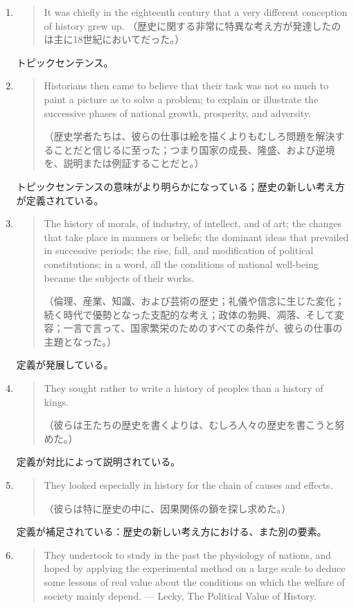 \begin{enumerate}
    \item \begin{quote}
        It was chiefly in the eighteenth century that a very different
conception of history grew up.
（歴史に関する非常に特異な考え方が発達したのは主に18世紀においてだった。）
    \end{quote}
    トピックセンテンス。
    \item 
    \begin{quote}
        Historians then came to believe that their task was not so much
to paint a picture as to solve a problem; to explain or illustrate the
successive phases of national growth, prosperity, and adversity.

（歴史学者たちは、彼らの仕事は絵を描くよりもむしろ問題を解決することだと信じるに至った；つまり国家の成長、隆盛、および逆境を、説明または例証することだと。）
    \end{quote}
    トピックセンテンスの意味がより明らかになっている；歴史の新しい考え方が定義されている。
    \item 
    \begin{quote}
        The history of morals, of industry, of intellect, and of art;
the changes that take place in manners or beliefs; the dominant ideas
that prevailed in successive periods; the rise, fall, and modification
of political constitutions; in a word, all the conditions of national
well-being became the subjects of their works.

（倫理、産業、知識、および芸術の歴史；礼儀や信念に生じた変化；続く時代で優勢となった支配的な考え；政体の勃興、凋落、そして変容；一言で言って、国家繁栄のためのすべての条件が、彼らの仕事の主題となった。）
    \end{quote}
    定義が発展している。
    \item 
    \begin{quote}
        They sought rather to write a history of peoples than a history
of kings.

（彼らは王たちの歴史を書くよりは、むしろ人々の歴史を書こうと努めた。）
    \end{quote}
    定義が対比によって説明されている。
    \item 
    \begin{quote}
        They looked especially in history for the chain of causes and
effects.

（彼らは特に歴史の中に、因果関係の鎖を探し求めた。）
    \end{quote}
    定義が補足されている：歴史の新しい考え方における、また別の要素。
    \item \begin{quote}
        They undertook to study in the past the physiology of nations,
and hoped by applying the experimental method on a large scale to deduce
some lessons of real value about the conditions on which the welfare of
society mainly depend. --- Lecky, The Political Value of History.


\end{quote}
\end{enumerate}
